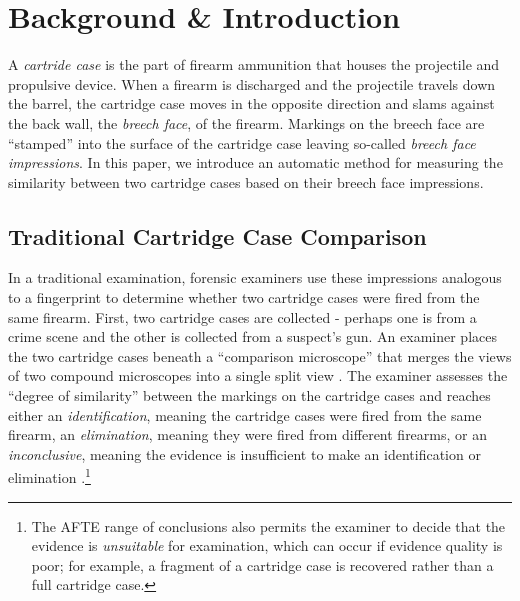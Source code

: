 \documentclass[reprint]{JASA}
\begin{document}




\hypertarget{introduction}{%
\section{Background \& Introduction}\label{introduction}}

A \emph{cartride case} is the part of firearm ammunition that houses the
projectile and propulsive device. When a firearm is discharged and the
projectile travels down the barrel, the cartridge case moves in the
opposite direction and slams against the back wall, the \emph{breech
face}, of the firearm. Markings on the breech face are ``stamped'' into
the surface of the cartridge case leaving so-called \emph{breech face
impressions}. In this paper, we introduce an automatic method for
measuring the similarity between two cartridge cases based on their
breech face impressions.

\hypertarget{traditional-cartridge-case-comparison}{%
\subsection{Traditional Cartridge Case
Comparison}\label{traditional-cartridge-case-comparison}}

In a traditional examination, forensic examiners use these impressions
analogous to a fingerprint to determine whether two cartridge cases were
fired from the same firearm. First, two cartridge cases are collected -
perhaps one is from a crime scene and the other is collected from a
suspect's gun. An examiner places the two cartridge cases beneath a
``comparison microscope'' that merges the views of two compound
microscopes into a single split view \citep{Thompson2017}. The examiner
assesses the ``degree of similarity'' between the markings on the
cartridge cases and reaches either an \emph{identification}, meaning the
cartridge cases were fired from the same firearm, an \emph{elimination},
meaning they were fired from different firearms, or an
\emph{inconclusive}, meaning the evidence is insufficient to make an
identification or elimination \citep{AFTE1992}.\footnote{The AFTE range
  of conclusions also permits the examiner to decide that the evidence
  is \emph{unsuitable} for examination, which can occur if evidence
  quality is poor; for example, a fragment of a cartridge case is
  recovered rather than a full cartridge case.}
\end{document}
